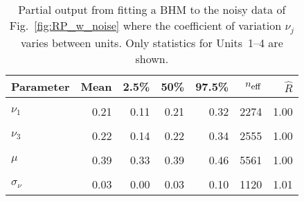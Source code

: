 \begin{table}
\centering
\caption{\label{tab:pp_nu}Partial output from fitting a BHM to the noisy data of Fig.~\ref{fig:RP_w_noise} where the coefficient of variation $\nu_j$ varies between units. Only statistics for Units~1--4 are shown.}
\centering
\begin{tabular}[t]{lrrrrrr}
\toprule
Parameter & Mean & 2.5\% & 50\% & 97.5\% & $n_{\small{\mbox{eff}}}$ & $\hat{R}$\\
\midrule
\cellcolor{gray!10}{$\sigma$} & \cellcolor{gray!10}{0.03} & \cellcolor{gray!10}{0.02} & \cellcolor{gray!10}{0.03} & \cellcolor{gray!10}{0.04} & \cellcolor{gray!10}{5116} & \cellcolor{gray!10}{1.00}\\
$\nu_1$ & 0.21 & 0.11 & 0.21 & 0.32 & 2274 & 1.00\\
\cellcolor{gray!10}{$\nu_2$} & \cellcolor{gray!10}{0.22} & \cellcolor{gray!10}{0.14} & \cellcolor{gray!10}{0.22} & \cellcolor{gray!10}{0.33} & \cellcolor{gray!10}{2896} & \cellcolor{gray!10}{1.00}\\
$\nu_3$ & 0.22 & 0.14 & 0.22 & 0.34 & 2555 & 1.00\\
\cellcolor{gray!10}{$\nu_4$} & \cellcolor{gray!10}{0.23} & \cellcolor{gray!10}{0.14} & \cellcolor{gray!10}{0.22} & \cellcolor{gray!10}{0.34} & \cellcolor{gray!10}{2503} & \cellcolor{gray!10}{1.00}\\
\addlinespace
$\mu$ & 0.39 & 0.33 & 0.39 & 0.46 & 5561 & 1.00\\
\cellcolor{gray!10}{$\mu_\nu$} & \cellcolor{gray!10}{0.22} & \cellcolor{gray!10}{0.15} & \cellcolor{gray!10}{0.22} & \cellcolor{gray!10}{0.31} & \cellcolor{gray!10}{2004} & \cellcolor{gray!10}{1.00}\\
$\sigma_\nu$ & 0.03 & 0.00 & 0.03 & 0.10 & 1120 & 1.01\\
\bottomrule
\end{tabular}
\end{table}
